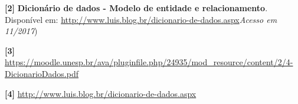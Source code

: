\documentclass[12pt,a4paper]{article}
\begin{document}
\noindent \textbf{[2]} \textbf{Dicionário de dados - Modelo de entidade e relacionamento}. Disponível em: \url{http://www.luis.blog.br/dicionario-de-dados.aspx}\textit{Acesso em 11/2017})\\\vspace{0.2cm}

\noindent \textbf{[3]} \url{https://moodle.unesp.br/ava/pluginfile.php/24935/mod\_resource/content/2/4-DicionarioDados.pdf}\\\vspace{0.2cm}

\noindent \textbf{[4]} \url{http://www.luis.blog.br/dicionario-de-dados.aspx}\\\vspace{0.2cm}
\end{document}

